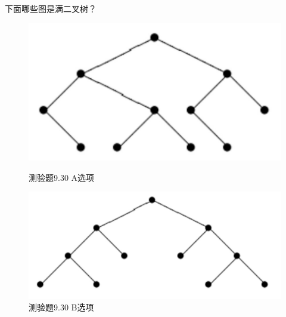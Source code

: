 \documentclass[UTF8, heading=true]{ctexart}
\begin{document}
下面哪些图是满二叉树？

\begin{figure}[H]
  \centering
  \begin{minipage}[t]{0.25\textwidth}
      \centering
      \includegraphics[width=1\textwidth]{9.30_1.jpg} %
      \vspace{-0.3cm}
      \caption{测验题9.30 A选项}
  \end{minipage}
  \hspace{0.18\textwidth} %
  \begin{minipage}[t]{0.29\textwidth}
      \centering
      \includegraphics[width=1\textwidth]{9.30_2.jpg} %
      \vspace{-0.3cm}
      \caption{测验题9.30 B选项}
\end{minipage}
\end{figure}
\end{document}
